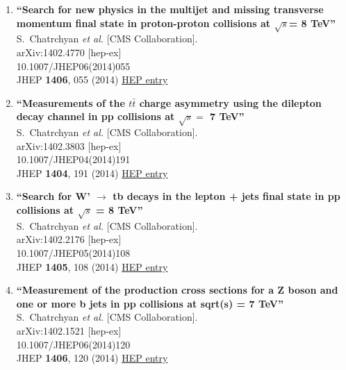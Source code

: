 \documentclass{article}
\begin{document}
\begin{enumerate}
\item%
{\bf ``Search for new physics in the multijet and missing transverse momentum final state in proton-proton collisions at $\sqrt{s}$= 8 TeV''}
  \\{}S.~Chatrchyan {\it et al.} [CMS Collaboration].
  \\{}arXiv:1402.4770 [hep-ex]
    \\{}10.1007/JHEP06(2014)055
\\{}JHEP {\bf 1406}, 055 (2014) %
\href{http://inspirehep.net/record/1281837}{HEP entry}


\item%
{\bf ``Measurements of the $t\bar{t}$ charge asymmetry using the dilepton decay channel in pp collisions at $\sqrt{s} =$ 7 TeV''}
  \\{}S.~Chatrchyan {\it et al.} [CMS Collaboration].
  \\{}arXiv:1402.3803 [hep-ex]
    \\{}10.1007/JHEP04(2014)191
\\{}JHEP {\bf 1404}, 191 (2014) %
\href{http://inspirehep.net/record/1281538}{HEP entry}


\item%
{\bf ``Search for W' $\to $ tb decays in the lepton + jets final state in pp collisions at $\sqrt{s}$ = 8 TeV''}
  \\{}S.~Chatrchyan {\it et al.} [CMS Collaboration].
  \\{}arXiv:1402.2176 [hep-ex]
    \\{}10.1007/JHEP05(2014)108
\\{}JHEP {\bf 1405}, 108 (2014) %
\href{http://inspirehep.net/record/1280718}{HEP entry}


\item%
{\bf ``Measurement of the production cross sections for a Z boson and one or more b jets in pp collisions at sqrt(s) = 7 TeV''}
  \\{}S.~Chatrchyan {\it et al.} [CMS Collaboration].
  \\{}arXiv:1402.1521 [hep-ex]
    \\{}10.1007/JHEP06(2014)120
\\{}JHEP {\bf 1406}, 120 (2014) %
\href{http://inspirehep.net/record/1280529}{HEP entry}



\end{enumerate}
\end{document}
